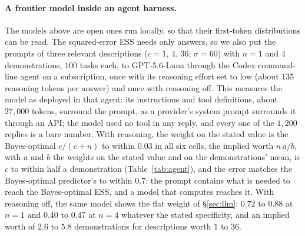\documentclass{article}
\begin{document}
\paragraph{A frontier model inside an agent harness.} The models above are open ones run locally, so that their first-token distributions can be read. The squared-error ESS needs only answers, so we also put the prompts of three relevant descriptions ($c = 1$, $4$, $36$; $\sigma = 60$) with $n = 1$ and $4$ demonstrations, $100$ tasks each, to GPT-5.6-Luna through the Codex command-line agent on a subscription, once with its reasoning effort set to low (about $135$ reasoning tokens per answer) and once with reasoning off. This measures the model as deployed in that agent: its instructions and tool definitions, about $27{,}000$ tokens, surround the prompt, as a provider's system prompt surrounds it through an API; the model used no tool in any reply, and every one of the $1{,}200$ replies is a bare number. With reasoning, the weight on the stated value is the Bayes-optimal $c/(c+n)$ to within $0.03$ in all six cells, the implied worth $n\,a/b$, with $a$ and $b$ the weights on the stated value and on the demonstrations' mean, is $c$ to within half a demonstration (Table~\ref{tab:agent}), and the error matches the Bayes-optimal predictor's to within $0.7$: the prompt contains what is needed to reach the Bayes-optimal ESS, and a model that computes reaches it. With reasoning off, the same model shows the flat weight of \S\ref{sec:llm}: $0.72$ to $0.88$ at $n = 1$ and $0.40$ to $0.47$ at $n = 4$ whatever the stated specificity, and an implied worth of $2.6$ to $5.8$ demonstrations for descriptions worth $1$ to $36$.

\begin{table}[!htb]
\centering\small
\caption{\textbf{A frontier model reaches the Bayes-optimal weight when it reasons and shows the flat weight of the open models when it does not.} GPT-5.6-Luna inside the Codex agent harness, $100$ tasks per cell, relevant descriptions at $\sigma = 60$; weight on the stated value and implied worth $n\,a/b$ from the regression of \S\ref{sec:llm}; bootstrap standard errors of the weights are at most $0.03$ with reasoning and $0.07$ without.}
\label{tab:agent}
\vspace{3pt}

\end{table}
\end{document}
